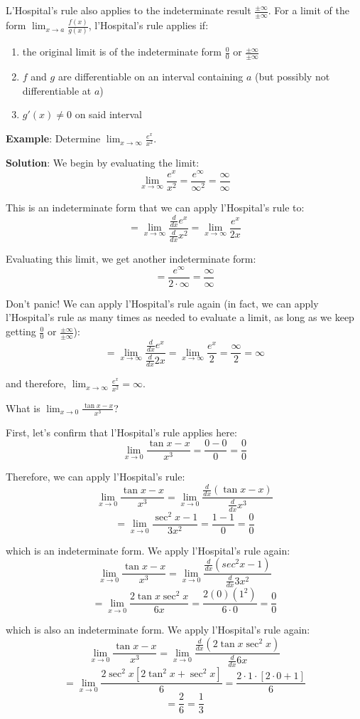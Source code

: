 L'Hospital's rule also applies to the indeterminate result $\frac{\pm \infty}
{\pm \infty}$. For a limit of the form $\lim_{x\to a}\frac{f(x)}{g(x)}$, 
l'Hospital's rule applies if:
\begin{enumerate}
    \item the original limit is of the indeterminate form $\frac{0}{0}$ or 
    $\frac{\pm \infty}{\pm \infty}$
    \item $f$ and $g$ are differentiable on an interval containing $a$ (but 
    possibly not differentiable at $a$)
    \item $g'(x) \neq 0$ on said interval
\end{enumerate}

\textbf{Example}: Determine $\lim_{x \to \infty} \frac{e^x}{x^2}$.

\textbf{Solution}: We begin by evaluating the limit:
$$\lim_{x \to \infty} \frac{e^x}{x^2} = \frac{e^{\infty}}{\infty^2} = 
\frac{\infty}{\infty}$$

This is an indeterminate form that we can apply l'Hospital's rule to:
$$= \lim_{x \to \infty} \frac{\frac{d}{dx}e^x}{\frac{d}{dx}x^2} = \lim_{x \to 
\infty} \frac{e^x}{2x}$$

Evaluating this limit, we get another indeterminate form:
$$=\frac{e^{\infty}}{2 \cdot \infty} = \frac{\infty}{\infty}$$

Don't panic! We can apply l'Hospital's rule again (in fact, we can apply 
l'Hospital's rule as many times as needed to evaluate a limit, as long as we 
keep getting $\frac{0}{0}$ or $\frac{\pm \infty}{\pm \infty}$):
$$= \lim_{x \to \infty} \frac{\frac{d}{dx}e^x}{\frac{d}{dx}2x} = \lim_{x \to 
\infty} \frac{e^x}{2} = \frac{\infty}{2} = \infty$$

and therefore, $\lim_{x \to \infty} \frac{e^x}{x^2} = \infty$.

\begin{Exercise}[label=LH1]
What is $\lim_{x \to 0} \frac{\tan{x} - x}{x^3}$?
\end{Exercise}

\begin{Answer}[ref=LH1]
First, let's confirm that l'Hospital's rule applies here:
$$\lim_{x \to 0} \frac{\tan{x} - x}{x^3} = \frac{0 - 0}{0} = \frac{0}{0}$$

Therefore, we can apply l'Hospital's rule:
$$\lim_{x \to 0} \frac{\tan{x} - x}{x^3} = \lim_{x \to 0} \frac{\frac{d}{dx}(\tan{x} - x)}{\frac{d}{dx}x^3}$$
$$= \lim_{x \to 0} \frac{\sec^2{x} - 1}{3x^2} = \frac{1 - 1}{0} = \frac{0}{0}$$

which is an indeterminate form. We apply l'Hospital's rule again:
$$\lim_{x \to 0} \frac{\tan{x} - x}{x^3} = \lim_{x \to 0} \frac{\frac{d}{dx}(sec^2{x} - 1)}{\frac{d}{dx}3x^2}$$
$$= \lim_{x \to 0} \frac{2\tan{x}\sec^2{x}}{6x} = \frac{2(0)(1^2)}{6 \cdot 0} = \frac{0}{0}$$

which is also an indeterminate form. We apply l'Hospital's rule again:
$$\lim_{x \to 0} \frac{\tan{x} - x}{x^3} = \lim_{x \to 0} \frac{\frac{d}{dx}(2\tan{x}\sec^2{x})}{\frac{d}{dx}6x}$$
$$= \lim_{x \to 0} \frac{2\sec^2{x}[2\tan^2{x} + \sec^2{x}]}{6} = \frac{2 \cdot 1 \cdot [2 \cdot 0 + 1]}{6}$$
$$= \frac{2}{6} = \frac{1}{3}$$
\end{Answer}


